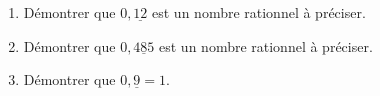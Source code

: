 
\begin{enumerate}
\item Démontrer que $0,\underline{12}$ est un nombre rationnel à préciser.
\item Démontrer que $0,\underline{485}$ est un nombre rationnel à préciser.
\item Démontrer que $0,\underline{9}=1$.
\end{enumerate}

